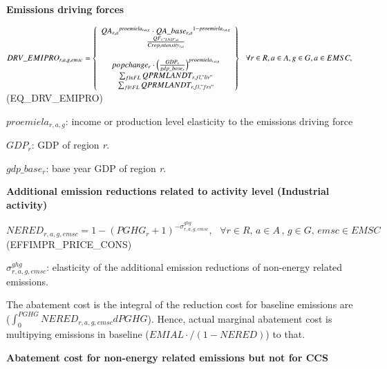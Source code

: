 \documentclass[10pt,a4paper,titlepage,dvipdfmx]{book}
\begin{document}
\begin{flushleft}\textbf{Emissions driving forces}\end{flushleft}

$DRV\_ EMIPRO_{r,a,g,emsc}=\left\{\begin{array}{c}
{QA_{r,a}}^{proemiela_{r,a,g}}\cdot {QA\_ base_{r,a}}^{{1-proemiela_{r,a,g}}}\\
\frac{QF_{r,"LND",a}}{Crop_intensity_{r,a}}\\
\\
popchange_{r}\cdot \left(\frac{GDP_{r}}{gdp\_ base_{r}}\right)^{proemiela_{r,a,g}}\\
\sum _{fl\in FL} QPRMLANDT_{r,fl,"liv"}\\
\sum _{fl\in FL} QPRMLANDT_{r,fl,"frs"}
\end{array}\right\}\,\,\,\,\forall r\in R, a\in A, g\in G, a\in EMSC,\,$   (EQ\_DRV\_EMIPRO)

\begin{flushleft}
$proemiela_{r,a,g}$: income or production level elasticity to the emissions driving force

$GDP_{r}$: GDP of region \textit{r}.

$gdp\_base_{r}$: base year GDP of region \textit{r}.
\end{flushleft}

\begin{flushleft}\textbf{Additional emission reductions related to activity level (Industrial activity)}\end{flushleft}

\begin{center}
$NERED_{r,a,g,emsc}=1-\left(PGHG_{r}+1\right)^{-\sigma _{r,a,g,emsc}^{ghg}},\,\,\,\,\forall r\in R,\,a\in A\,,\,g\in G,\,emsc\in EMSC$             (EFFIMPR\_PRICE\_CONS)
\end{center}

\begin{flushleft} $\sigma _{r,a,g,emsc}^{ghg}$: elasticity of the additional emission reductions of non-energy related emissions. \end{flushleft}

The abatement cost is the integral of the reduction cost for baseline emissions are ($\int _{0}^{PGHG} NERED_{r,a,g,emsc}dPGHG$). Hence, actual marginal abatement cost is multipying emissions in baseline ($EMIAL\cdot/(1-NERED)$) to that.

\begin{flushleft}\textbf{Abatement cost for non-energy related emissions but not for CCS}\end{flushleft}
\end{document}
